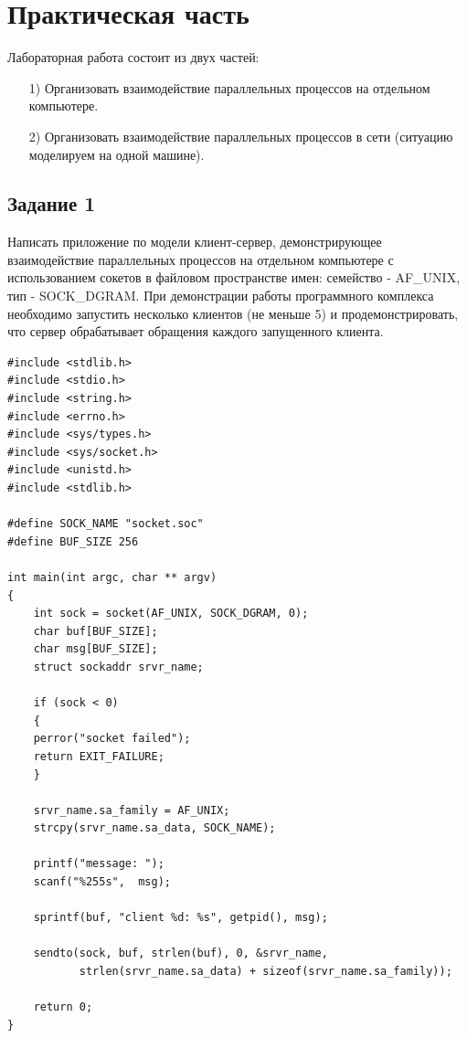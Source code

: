 \chapter{Практическая часть}

Лабораторная работа состоит из двух частей:
\begin{itemize}
    \item[1)] Организовать взаимодействие параллельных процессов на отдельном компьютере.
    \item[2)] Организовать взаимодействие параллельных процессов в сети (ситуацию моделируем на одной машине).
\end{itemize}

\section{Задание \No{}1}
Написать приложение по модели клиент-сервер, демонстрирующее взаимодействие параллельных процессов на отдельном компьютере с использованием сокетов в файловом пространстве имен: семейство - AF\_UNIX, тип - SOCK\_DGRAM.
При демонстрации работы программного комплекса необходимо запустить несколько клиентов (не меньше 5) и продемонстрировать, что сервер обрабатывает обращения каждого запущенного клиента.

\lstset{language=c}
\begin{lstlisting}[caption=Текст программы клиента из первого задания]
#include <stdlib.h>
#include <stdio.h>
#include <string.h>
#include <errno.h>
#include <sys/types.h>
#include <sys/socket.h>
#include <unistd.h>
#include <stdlib.h>

#define SOCK_NAME "socket.soc"
#define BUF_SIZE 256

int main(int argc, char ** argv)
{
    int sock = socket(AF_UNIX, SOCK_DGRAM, 0);
    char buf[BUF_SIZE];
    char msg[BUF_SIZE];
    struct sockaddr srvr_name;

    if (sock < 0)
    {
    perror("socket failed");
    return EXIT_FAILURE;
    }

    srvr_name.sa_family = AF_UNIX;
    strcpy(srvr_name.sa_data, SOCK_NAME);

    printf("message: ");
    scanf("%255s",  msg);

    sprintf(buf, "client %d: %s", getpid(), msg);

    sendto(sock, buf, strlen(buf), 0, &srvr_name,
           strlen(srvr_name.sa_data) + sizeof(srvr_name.sa_family));

    return 0;
}
\end{lstlisting}

